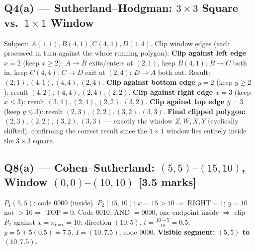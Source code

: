 \documentclass[12pt, a4paper]{article}
\newenvironment{solutionbox}{\begin{mdframed}[style=solutionframe]}{\end{mdframed}}
\begin{document}
\subsection*{Q4(a) --- Sutherland--Hodgman: $3\times3$ Square vs.\ $1\times1$ Window}
\begin{solutionbox}
Subject: $A(1,1),B(4,1),C(4,4),D(1,4)$. Clip window edges (each processed in turn against the whole running polygon):
\textbf{Clip against left edge $x=2$} (keep $x\ge2$): $A{\to}B$ exits/enters at $(2,1)$, keep $B(4,1)$; $B{\to}C$ both in, keep $C(4,4)$; $C{\to}D$ exit at $(2,4)$; $D{\to}A$ both out. Result: $(2,1),(4,1),(4,4),(2,4)$.
\textbf{Clip against bottom edge $y=2$} (keep $y\ge2$): result $(4,2),(4,4),(2,4),(2,2)$.
\textbf{Clip against right edge $x=3$} (keep $x\le3$): result $(3,4),(2,4),(2,2),(3,2)$.
\textbf{Clip against top edge $y=3$} (keep $y\le3$): result $(2,3),(2,2),(3,2),(3,3)$.
\textbf{Final clipped polygon: $(2,3),(2,2),(3,2),(3,3)$} --- exactly the window $Z,W,X,Y$ (cyclically shifted), confirming the correct result since the $1\times1$ window lies entirely inside the $3\times3$ square.
\end{solutionbox}

\subsection*{Q8(a) --- Cohen--Sutherland: $(5,5)$--$(15,10)$, Window $(0,0)$--$(10,10)$ [3.5 marks]}
\begin{solutionbox}
$P_1(5,5)$: code $0000$ (inside). $P_2(15,10)$: $x=15>10\Rightarrow$ RIGHT$=1$; $y=10$ not $>10\Rightarrow$ TOP$=0$. Code $0010$.
AND $=0000$, one endpoint inside $\Rightarrow$ clip $P_2$ against $x=x_{\max}=10$: direction $(10,5)$, $t=\frac{10-5}{10}=0.5$, $y=5+5(0.5)=7.5$. $I=(10,7.5)$, code $0000$.
\textbf{Visible segment: $(5,5)$ to $(10,7.5)$.}
\end{solutionbox}

\end{document}
